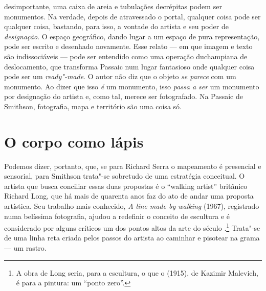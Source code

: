 desimportante, uma caixa de areia e tubulações decrépitas podem ser
monumentos. Na verdade, depois de atravessado o portal, qualquer coisa
pode ser qualquer coisa, bastando, para isso, a vontade do artista e seu
poder de \emph{designação}. O espaço geográfico, dando lugar a um espaço
de pura representação, pode ser escrito e desenhado novamente. Esse
relato --- em que imagem e texto são indissociáveis --- pode ser entendido
como uma operação duchampiana de deslocamento, que transforma Passaic
num lugar fantasioso onde qualquer coisa pode ser um \emph{ready"-made}.
O autor não diz que o objeto \emph{se parece} com um monumento. Ao dizer
que isso \emph{é} um monumento, isso \emph{passa a ser} um monumento por
designação do artista e, como tal, merece ser fotografado. Na Passaic de
Smithson, fotografia, mapa e território são uma coisa só.

\chapter{O corpo como lápis}

Podemos dizer, portanto, que, se para Richard Serra o mapeamento é
presencial e sensorial, para Smithson trata"-se sobretudo de uma
estratégia conceitual. O artista que busca conciliar essas duas
propostas é o ``walking artist'' britânico Richard Long, que há mais de
quarenta anos faz do ato de andar uma proposta artística. Seu trabalho
mais conhecido, \emph{A line made by walking} (1967), registrado numa
belíssima fotografia, ajudou a redefinir o conceito de escultura e é
considerado por alguns críticos um dos pontos altos da arte do século
.\footnote{A obra de Long seria, para a escultura, o que o
  {} (1915), de Kazimir Malevich, é para a pintura: um
  ``ponto zero''.} Trata"-se de uma linha reta
criada pelos passos do artista ao caminhar e pisotear na grama --- um
rastro.

